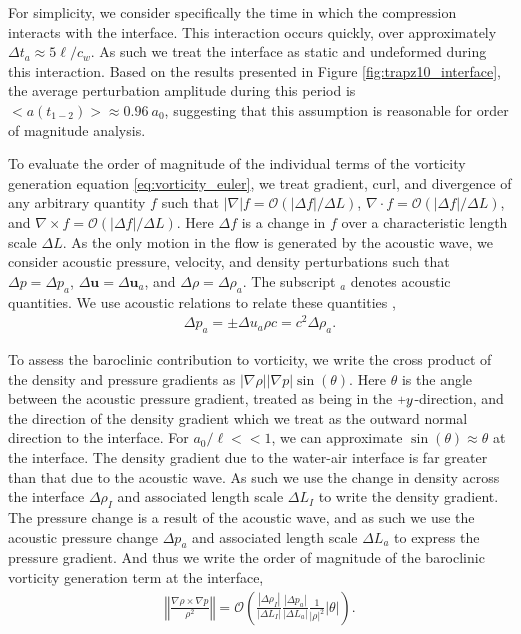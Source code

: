 \documentclass{article}
\newcommand{\orderof}[1]{\ensuremath{\mathcal{O}\left(#1\right)}}
\newcommand{\abs}[1]{\ensuremath{\left|#1\right|}}
\newcommand{\norm}[1]{\ensuremath{\left\Vert#1\right\Vert}}
\newcommand{\plus}{\raisebox{.2\height}{\scalebox{.8}{+}}}
\begin{document}
For simplicity, we consider specifically the time in which the
compression interacts with the interface. This interaction occurs
quickly, over approximately $\Delta t_a\approx5\ell/c_{w}$. As such we
treat the interface as static and undeformed during this
interaction. Based on the results presented in Figure
\ref{fig:trapz10_interface}, the average perturbation amplitude during
this period is $<a(t_{1-2})>\approx0.96\ a_0$, suggesting that this
assumption is reasonable for order of magnitude analysis.

To evaluate the order of magnitude of the individual terms of the
vorticity generation equation \eqref{eq:vorticity_euler}, we treat
gradient, curl, and divergence of any arbitrary quantity $f$ such that
$\abs{\nabla} f= \orderof{\left|\Delta f\right|/\Delta L}$,
$\nabla\cdot f=\orderof{\left|\Delta f\right|/\Delta L}$, and
$\nabla\times f=\orderof{\left|\Delta f\right|/\Delta L}$. Here
$\Delta f$ is a change in $f$ over a characteristic length scale
$\Delta L$. As the only motion in the flow is generated by the
acoustic wave, we consider acoustic pressure, velocity, and density
perturbations such that $\Delta p=\Delta p_a$,
$\Delta \boldsymbol{u}=\Delta \boldsymbol{u}_a$, and
$\Delta \rho=\Delta \rho_a$. The subscript $_a$ denotes acoustic
quantities. We use acoustic relations to relate these quantities
\citep{Anderson1990},
\begin{align}%
  \label{eq:acoustic_relations}%
  \Delta p_a=\pm\Delta u_a \rho c=c^2\Delta \rho_a.%
\end{align}

To assess the baroclinic contribution to vorticity, we write the cross
product of the density and pressure gradients as
$\abs{\nabla \rho} \abs{\nabla p} \sin{\left(\theta\right)}$. Here
$\theta$ is the angle between the acoustic pressure gradient, treated
as being in the $\plus y$-direction, and the direction of the density
gradient which we treat as the outward normal direction to the
interface. For $a_0/\ell<<1$, we can approximate
$\sin{\left(\theta\right)}\approx\theta$ at the interface. The density
gradient due to the water-air interface is far greater than that due
to the acoustic wave. As such we use the change in density across the
interface $\Delta \rho_I$ and associated length scale $\Delta L_I$ to
write the density gradient. The pressure change is a result of the
acoustic wave, and as such we use the acoustic pressure change
$\Delta p_a$ and associated length scale $\Delta L_a$ to express the
pressure gradient. And thus we write the order of magnitude of the
baroclinic vorticity generation term at the interface,
\begin{align}
  \label{eq:baroclinic_vorticity}%
  \norm{\frac{\nabla\rho\times\nabla p}{\rho^2}} =%
  \orderof{\frac{\abs{\Delta \rho_I}}{\abs{\Delta L_I}}\frac{\abs{\Delta p_a}}{\abs{\Delta L_a}}\frac{1}{\abs{\rho}^2}\abs{\theta}}.%
\end{align}
\end{document}
